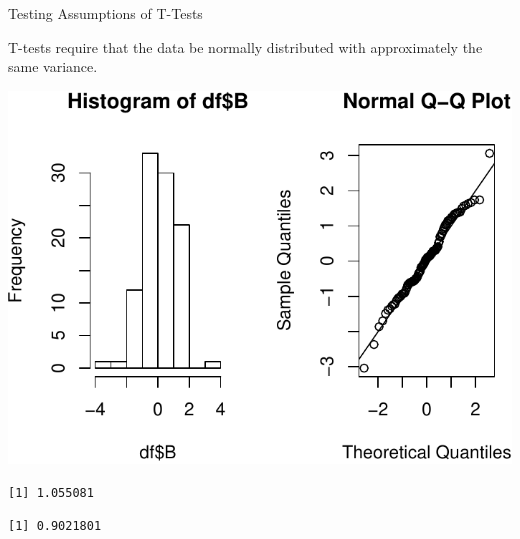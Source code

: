 \begin{frame}[fragile]{Testing Assumptions of T-Tests}

T-tests require that the data be normally distributed with approximately
the same variance.

\begin{Shaded}
\begin{Highlighting}[]
\NormalTok{(} \NormalTok{(}\NormalTok{,}\NormalTok{))}
\OperatorTok{$}
\OperatorTok{$}
\NormalTok{(}\NormalTok{, }\NormalTok{)}
\end{Highlighting}
\end{Shaded}

\includegraphics{04_BasicAnalyses_files/figure-beamer/unnamed-chunk-5-1.pdf}

\begin{Shaded}
\begin{Highlighting}[]
\OperatorTok{$}
\end{Highlighting}
\end{Shaded}

\begin{verbatim}
[1] 1.055081
\end{verbatim}

\begin{Shaded}
\begin{Highlighting}[]
\OperatorTok{$}
\end{Highlighting}
\end{Shaded}

\begin{verbatim}
[1] 0.9021801
\end{verbatim}

\end{frame}

